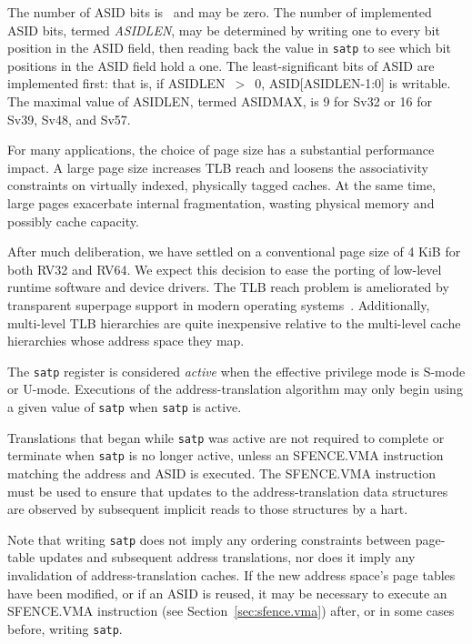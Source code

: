 The number of ASID bits is \unspecified\ and may be zero.  The
number of implemented ASID bits, termed {\mbox {\em ASIDLEN}}, may be
determined by writing one to every bit position in the ASID field, then
reading back the value in {\tt satp} to see which bit positions in the ASID
field hold a one.  The least-significant bits of ASID are implemented first:
that is, if ASIDLEN~$>$~0, ASID[ASIDLEN-1:0] is writable.  The maximal value
of ASIDLEN, termed ASIDMAX, is 9 for Sv32 or 16 for Sv39, Sv48, and Sv57.

\begin{commentary}
For many applications, the choice of page size has a substantial
performance impact.  A large page size increases TLB reach and loosens
the associativity constraints on virtually indexed, physically tagged
caches.  At the same time, large pages exacerbate internal
fragmentation, wasting physical memory and possibly cache capacity.

After much deliberation, we have settled on a conventional page size
of 4 KiB for both RV32 and RV64.  We expect this decision to ease the
porting of low-level runtime software and device drivers.  The TLB
reach problem is ameliorated by transparent superpage support in
modern operating systems~\cite{transparent-superpages}.  Additionally,
multi-level TLB hierarchies are quite inexpensive relative to the
multi-level cache hierarchies whose address space they map.
\end{commentary}

The {\tt satp} register is considered {\em active} when the effective
privilege mode is S-mode or U-mode.
Executions of the
address-translation algorithm may only begin using a given value of {\tt satp}
when {\tt satp} is active.

\begin{commentary}
Translations that began while {\tt satp} was active are not required to
complete or terminate when {\tt satp} is no longer active, unless an
SFENCE.VMA instruction matching the address and ASID is executed.  The
SFENCE.VMA instruction must be used to ensure that updates to the
address-translation data structures are observed by subsequent implicit reads
to those structures by a hart.
\end{commentary}

Note that writing {\tt satp} does not imply any ordering constraints
between page-table updates and subsequent address translations, nor does
it imply any invalidation of address-translation caches.
If the new address space's page tables have been modified, or if an
ASID is reused, it may be necessary to execute an SFENCE.VMA instruction
(see Section~\ref{sec:sfence.vma}) after, or in some cases before,
writing {\tt satp}.

